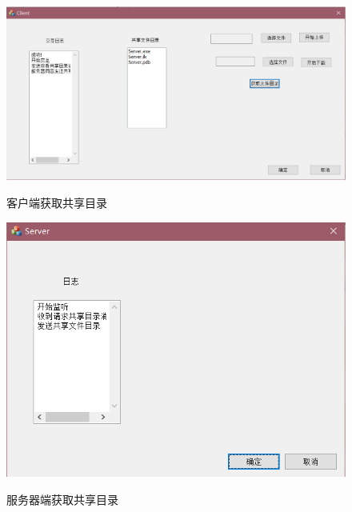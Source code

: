 \begin{figure}[H]
  \centering
  \includegraphics[width=0.8\linewidth]{figure/client_file_dic}\\
  \caption{客户端获取共享目录}
\end{figure}

\begin{figure}[H]
  \centering
  \includegraphics[width=0.8\linewidth]{figure/server_file_dic}\\
  \caption{服务器端获取共享目录}
\end{figure}

